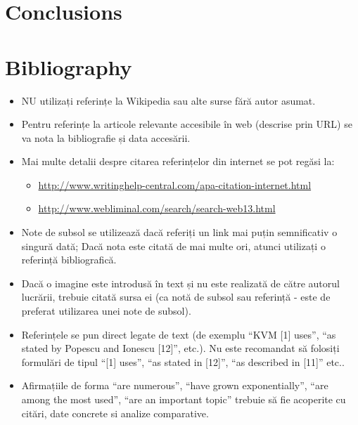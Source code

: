 \documentclass[12pt,a4paper]{report}
\begin{document}
\chapter{Conclusions}

\chapter*{Bibliography}  
% 
% 

\begin{itemize}
	\item 	NU utilizați referințe la Wikipedia sau alte surse fără autor asumat.
	\item 	Pentru referințe la articole relevante accesibile în web (descrise prin URL) se va nota la bibliografie și data accesării.
	\item 	Mai multe detalii despre citarea referințelor din internet se pot regăsi la:
	\begin{itemize}
		\item	\url{http://www.writinghelp-central.com/apa-citation-internet.html}
		\item	\url{http://www.webliminal.com/search/search-web13.html}
	\end{itemize}
	\item 	Note de subsol se utilizează dacă referiți un link mai puțin semnificativ o singură dată; Dacă nota este citată de mai multe ori, atunci utilizați o referință bibliografică.
	\item 	Dacă o imagine este introdusă în text și nu este realizată de către autorul lucrării, trebuie citată sursa ei (ca notă de subsol sau referință - este de preferat utilizarea unei note de subsol).
	\item 	Referințele se pun direct legate de text (de exemplu ``KVM [1] uses'', ``as stated by Popescu and Ionescu [12]'', etc.). Nu este recomandat să folosiți formulări de tipul ``[1] uses'', ``as stated in [12]'', ``as described in [11]'' etc..
	\item 	Afirmațiile de forma ``are numerous'', ``have grown exponentially'', ``are among the most used'', ``are an important topic'' trebuie să fie acoperite cu citări, date concrete si analize comparative.
	\begin{itemize}

\end{itemize}
\end{itemize}
\end{document}
